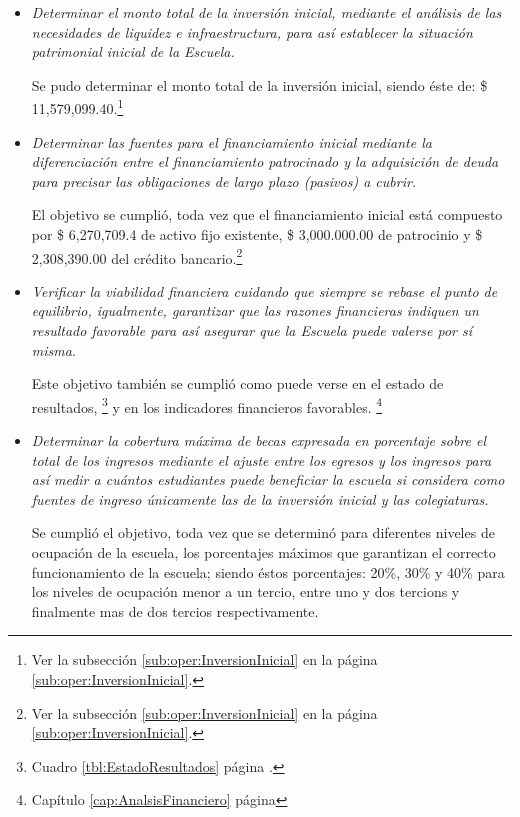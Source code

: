 \begin{itemize}
	\item \emph{Determinar el monto total de la inversión inicial, mediante el análisis de las necesidades de liquidez e infraestructura, para así establecer la situación patrimonial inicial de la Escuela.}
	
		Se pudo determinar el monto total de la inversión inicial, siendo éste de: \$ 11,579,099.40.\footnote{Ver la subsección \ref{sub:oper:InversionInicial} en la página \ref{sub:oper:InversionInicial}.}

	\item \emph{Determinar las fuentes para el financiamiento inicial mediante la diferenciación entre el financiamiento patrocinado y la adquisición de deuda para precisar las obligaciones de largo plazo (pasivos) a cubrir.}

		El objetivo se cumplió, toda vez que el financiamiento inicial está compuesto por \$ 6,270,709.4 de activo fijo existente, \$ 3,000.000.00 de patrocinio y \$ 2,308,390.00 del crédito bancario.\footnote{Ver la subsección \ref{sub:oper:InversionInicial} en la página \ref{sub:oper:InversionInicial}.}

	\item \emph{Verificar la viabilidad financiera cuidando que siempre se rebase el punto de equilibrio, igualmente, garantizar que las razones financieras indiquen un resultado favorable para así asegurar que la Escuela puede \emph{valerse por sí misma}}.

		Este objetivo también se cumplió como puede verse en el estado de resultados, \footnote{Cuadro \ref{tbl:EstadoResultados} página \pageref{tbl:EstadoResultados}.} y en los indicadores financieros favorables. \footnote{Capítulo \ref{cap:AnalsisFinanciero} página \pageref{cap:AnalsisFinanciero}}

	\item \emph{Determinar la cobertura máxima de becas expresada en porcentaje sobre el total de los ingresos mediante el ajuste entre los egresos y los ingresos para así medir a cuántos estudiantes puede beneficiar la escuela si considera como fuentes de ingreso únicamente las de la inversión inicial y las colegiaturas.}

		Se cumplió el objetivo, toda vez que se determinó para diferentes niveles de ocupación de la escuela, los porcentajes máximos que garantizan el correcto funcionamiento de la escuela; siendo éstos porcentajes: 20\%, 30\% y 40\% para los niveles de ocupación menor a un tercio, entre uno y dos tercions y finalmente mas de dos tercios respectivamente.


\end{itemize}

